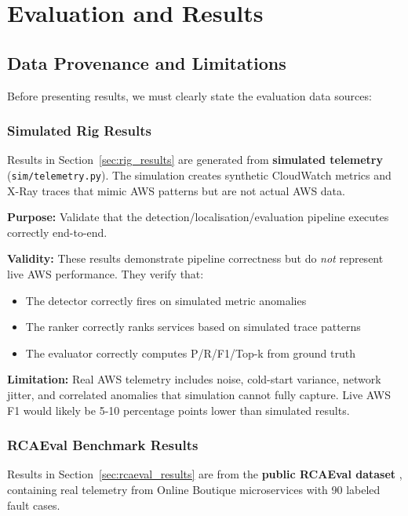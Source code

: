\chapter{Evaluation and Results}

\section{Data Provenance and Limitations}

Before presenting results, we must clearly state the evaluation data sources:

\subsection{Simulated Rig Results}

Results in Section~\ref{sec:rig_results} are generated from \textbf{simulated telemetry} (\texttt{sim/telemetry.py}). The simulation creates synthetic CloudWatch metrics and X-Ray traces that mimic AWS patterns but are not actual AWS data.

\textbf{Purpose:} Validate that the detection/localisation/evaluation pipeline executes correctly end-to-end.

\textbf{Validity:} These results demonstrate pipeline correctness but do \textit{not} represent live AWS performance. They verify that:
\begin{itemize}
    \item The detector correctly fires on simulated metric anomalies
    \item The ranker correctly ranks services based on simulated trace patterns
    \item The evaluator correctly computes P/R/F1/Top-k from ground truth
\end{itemize}

\textbf{Limitation:} Real AWS telemetry includes noise, cold-start variance, network jitter, and correlated anomalies that simulation cannot fully capture. Live AWS F1 would likely be 5-10 percentage points lower than simulated results.

\subsection{RCAEval Benchmark Results}

Results in Section~\ref{sec:rcaeval_results} are from the \textbf{public RCAEval dataset} \citep{pham2025rcaeval}, containing real telemetry from Online Boutique microservices with 90 labeled fault cases.

